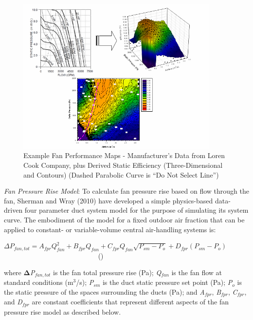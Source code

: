 \begin{figure}[hbtp] %
\centering
\includegraphics[width=0.9\textwidth, height=0.9\textheight, keepaspectratio=true]{media/image4888.png}
\caption{Example Fan Performance Maps - Manufacturer’s Data from Loren Cook Company, plus Derived Static Efficiency (Three-Dimensional and Contours) (Dashed Parabolic Curve is “Do Not Select Line”) \protect \label{fig:example-fan-performance-maps-manufacturers}}
\end{figure}

\emph{Fan Pressure Rise Model}: To calculate fan pressure rise based on flow through the fan, Sherman and Wray (2010) have developed a simple physics-based data-driven four parameter duct system model for the purpose of simulating its system curve. The embodiment of the model for a fixed outdoor air fraction that can be applied to constant- or variable-volume central air-handling systems is:

\(\Delta {P_{fan,tot}} = {A_{fpr}}Q_{fan}^2 + {B_{fpr}}Q_{fan}^{} + {C_{fpr}}Q_{fan}^{}\sqrt {{P_{sm}} - {P_o}} + {D_{fpr}}\left( {{P_{sm}} - {P_o}} \right)\) ~~~~~~~~~~~~~~~~~~~~~~~~~~~ ()

where \textbf{Δ}\emph{P\(_{fan,tot}\)} is the fan total pressure rise (Pa); \emph{Q\(_{fan}\)} is the fan flow at standard conditions (m\(^{3}\)/s); \emph{P\(_{sm}\)} is the duct static pressure set point (Pa); \emph{P\(_{o}\)} is the static pressure of the spaces surrounding the ducts (Pa); and \emph{A\(_{fpr}\)}, \emph{B\(_{fpr}\)}, \emph{C\(_{fpr}\)}, and \emph{D\(_{fpr}\)} are constant coefficients that represent different aspects of the fan pressure rise model as described below.

